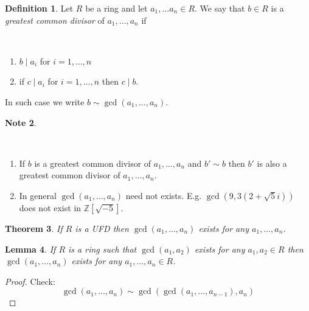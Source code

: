 \documentclass[12pt, letterpaper, oneside]{article}
\theoremstyle{plain}
\newtheorem{theorem}{Theorem}[section]
\newtheorem{lemma}[theorem]{Lemma}
\theoremstyle{definition}
\newtheorem{definition}[theorem]{Definition}
\newtheorem{note}[theorem]{Note}
\newcommand{\Z}{{\mathbb Z}}
\newcommand{\benu}{\begin{enumerate}}
\newcommand{\eenu}{\end{enumerate}}
\newcommand{\vs}{\vskip 5mm}
\newcommand{\isep}[1][0]{\setlength{\itemsep}{#1 mm}}
\begin{document}
 
 \begin{definition}
 Let $R$ be a ring and let $a_{1}, \dots a_{n}\in R$. 
 We say that $b\in R$ is a \emph{greatest common divisor} of $a_{1}, \dots, a_{n}$
 if 
 
 \vskip -13mm
 
 \ 
 \benu
 \isep[0]
 \item $b\mid a_{i}$ for $i=1, \dots, n$
 \item if $c\mid a_{i}$ for $i=1, \dots, n$ then $c\mid b$.
 \eenu
 
 \vskip -5mm
 
 In such case we write $b\sim \gcd(a_{1}, \dots, a_{n})$.
 \end{definition}
 
 
 \vs\vs
 
 \begin{note}\ 
 
 \vskip -13mm
 
 \ 
 \benu
 \isep[5]
 \item If $b$ is a greatest common divisor of $a_{1}, \dots, a_{n}$ and $b'\sim b$ then $b'$ 
 is also a greatest common divisor of $a_{1}, \dots, a_{n}$.  
 \item In general $\gcd(a_{1}, \dots, a_{n})$ need not exists. E.g. $\gcd(9, 3(2+\sqrt{5}i))$ 
 does not exist in $\Z[\sqrt{-5}]$. 
 \eenu
 \end{note}
 
 \vs\vs
 
 \begin{theorem}
 \label{THM_GCDSINUFDS}
 If $R$ is a UFD then $\gcd(a_{1}, \dots, a_{n})$ exists for any $a_{1}, \dots, a_{n}$.
 \end{theorem}
 
 
 \vs\vs
 
 \begin{lemma}
 \label{LEMMA_GCD}
 If $R$ is a ring such that $\gcd(a_{1}, a_{2})$ exists for any $a_{1}, a_{2}\in R$ then 
 $\gcd(a_{1}, \dots, a_{n})$ exists for any $a_{1}, \dots, a_{n}\in R$.
 \end{lemma}
 
 \vs
 
 \begin{proof}
 Check:
 $$\gcd(a_{1}, \dots, a_{n}) \sim \gcd(\gcd(a_{1}, \dots, a_{n-1}), a_{n})$$
 \end{proof}
 
 \vs
 
\end{document}
